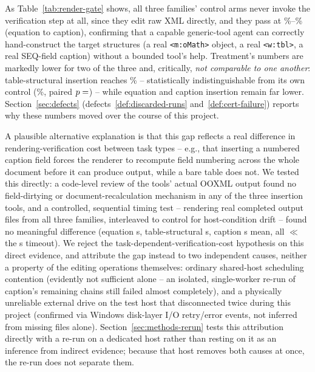 \documentclass[11pt]{article}
\DeclareRobustCommand{\claim}[2]{#2}
\begin{document}
As Table~\ref{tab:render-gate} shows, \claim{control-never-invokes-verification}{all three families' control arms never invoke the verification step at all, since they edit raw
XML directly,} and they pass at \%--\% (equation to caption),
\claim{native-ooxml-structures}{confirming that a capable generic-tool agent can correctly hand-construct the target structures
(a real \texttt{<m:oMath>} object, a real \texttt{<w:tbl>}, a real SEQ-field caption) without a
bounded tool's help.} \claim{original-host-two-of-three-depressed}{Treatment's numbers are markedly lower for two of the three and, critically,
\emph{not comparable to one another}: \claim{table-structural-close-originally}{table-structural insertion reaches \val{rg.table.treatment.rate}\% -- statistically
indistinguishable from its own control (\val{rg.table.control.rate}\%, paired $p=\val{rg.table.p}$)} -- while equation and caption
insertion remain far lower.} \claim{render-gate-retry-history}{\claim{defects-materially-changed-numbers}{Section~\ref{sec:defects}
(defects~\ref{def:discarded-runs} and~\ref{def:cert-failure}) reports why these numbers moved over
the course of this project.}}

A plausible alternative explanation is that this gap reflects a real difference in
rendering-verification cost between task types -- e.g., that inserting a numbered caption field
forces the renderer to recompute field numbering across the whole document before it can produce
output, while a bare table does not. \claim{render-cost-hypothesis-rejected}{We tested this directly: a code-level review of the tools'
actual OOXML output found no field-dirtying or document-recalculation mechanism in any of the
three insertion tools, and a controlled, sequential timing test -- rendering real completed
output files from all three families, interleaved to control for host-condition drift -- found no
meaningful difference} (equation s, table-structural s, caption s mean, all $\ll$ the s
timeout). \claim{render-cost-hypothesis-rejected}{We reject the task-dependent-verification-cost hypothesis on this direct evidence,} and
\claim{gap-causes-contention-and-drive}{\claim{gap-was-deployment-artifact}{attribute the gap instead to two independent causes, neither a property of the editing operations
themselves}: ordinary shared-host scheduling contention (evidently not sufficient alone -- an
isolated, single-worker re-run of caption's remaining chains still failed almost completely), and
\claim{external-drive-unreliable}{a physically unreliable external drive on the test host that disconnected twice during this
project (confirmed via Windows disk-layer I/O retry/error events, not inferred from missing files
alone).}} \claim{rerun-is-direct-test}{Section~\ref{sec:methods-rerun} tests this attribution directly with a re-run on a
dedicated host rather than resting on it as an inference from indirect evidence; because that
host removes both causes at once, the re-run does not separate them.}
\end{document}
